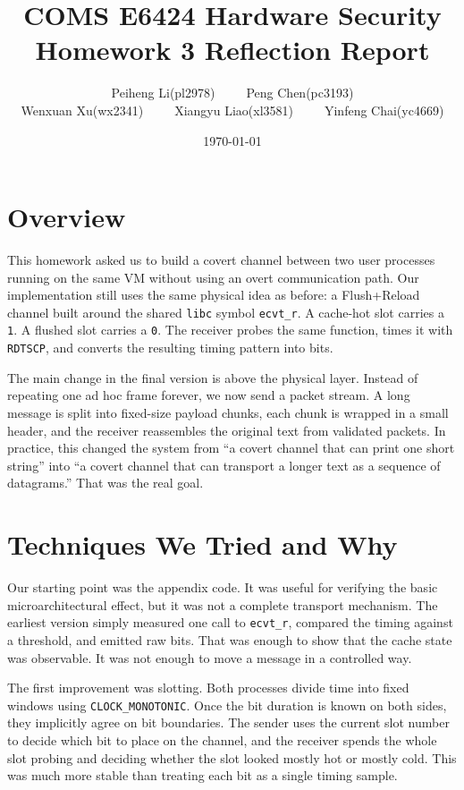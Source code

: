\documentclass[11pt]{article}
\title{COMS E6424 Hardware Security\\Homework 3 Reflection Report}
\author{Peiheng Li(pl2978)~~~~~Peng Chen(pc3193)\\Wenxuan Xu(wx2341)~~~~~Xiangyu Liao(xl3581)~~~~~Yinfeng Chai(yc4669)}
\date{\today}
\begin{document}
\maketitle

\section{Overview}
This homework asked us to build a covert channel between two user processes running on the same VM without using an overt communication path. Our implementation still uses the same physical idea as before: a Flush+Reload channel built around the shared \texttt{libc} symbol \texttt{ecvt\_r}. A cache-hot slot carries a \texttt{1}. A flushed slot carries a \texttt{0}. The receiver probes the same function, times it with \texttt{RDTSCP}, and converts the resulting timing pattern into bits.

The main change in the final version is above the physical layer. Instead of repeating one ad hoc frame forever, we now send a packet stream. A long message is split into fixed-size payload chunks, each chunk is wrapped in a small header, and the receiver reassembles the original text from validated packets. In practice, this changed the system from ``a covert channel that can print one short string'' into ``a covert channel that can transport a longer text as a sequence of datagrams.'' That was the real goal.

\section{Techniques We Tried and Why}
Our starting point was the appendix code. It was useful for verifying the basic microarchitectural effect, but it was not a complete transport mechanism. The earliest version simply measured one call to \texttt{ecvt\_r}, compared the timing against a threshold, and emitted raw bits. That was enough to show that the cache state was observable. It was not enough to move a message in a controlled way.

The first improvement was slotting. Both processes divide time into fixed windows using \texttt{CLOCK\_MONOTONIC}. Once the bit duration is known on both sides, they implicitly agree on bit boundaries. The sender uses the current slot number to decide which bit to place on the channel, and the receiver spends the whole slot probing and deciding whether the slot looked mostly hot or mostly cold. This was much more stable than treating each bit as a single timing sample.
\end{document}
